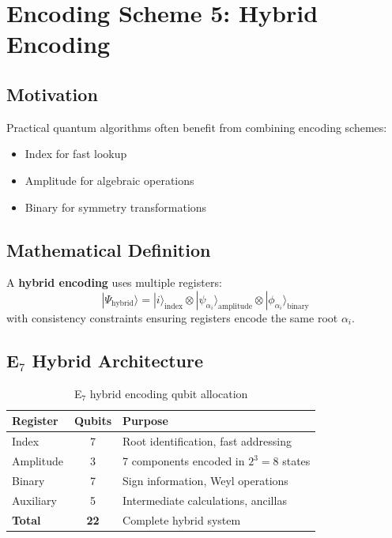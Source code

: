 \section{Encoding Scheme 5: Hybrid Encoding}

\subsection{Motivation}

Practical quantum algorithms often benefit from combining encoding schemes:
\begin{itemize}
    \item Index for fast lookup
    \item Amplitude for algebraic operations
    \item Binary for symmetry transformations
\end{itemize}

\subsection{Mathematical Definition}

\begin{definition}
\label{def:hybrid_encoding}
A \textbf{hybrid encoding} uses multiple registers:
\begin{equation}
|\Psi_{\text{hybrid}}\rangle = |i\rangle_{\text{index}} \otimes |\psi_{\alpha_i}\rangle_{\text{amplitude}} \otimes |\phi_{\alpha_i}\rangle_{\text{binary}}
\end{equation}
with consistency constraints ensuring registers encode the same root $\alpha_i$.
\end{definition}

\subsection{E$_7$ Hybrid Architecture}

\begin{table}[h]
\centering
\begin{tabular}{lcp{7cm}}
\toprule
\textbf{Register} & \textbf{Qubits} & \textbf{Purpose} \\
\midrule
Index & 7 & Root identification, fast addressing \\
Amplitude & 3 & 7 components encoded in $2^3 = 8$ states \\
Binary & 7 & Sign information, Weyl operations \\
Auxiliary & 5 & Intermediate calculations, ancillas \\
\midrule
\textbf{Total} & \textbf{22} & Complete hybrid system \\
\bottomrule
\end{tabular}
\caption{E$_7$ hybrid encoding qubit allocation}
\label{tab:hybrid_allocation}
\end{table}

